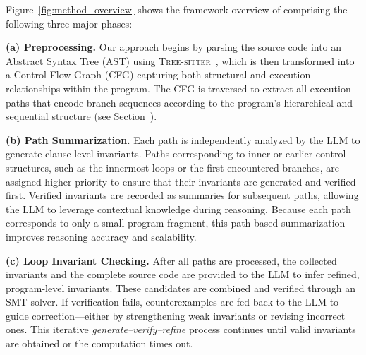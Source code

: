 \documentclass[letterpaper]{article} %
\begin{document}
Figure~\ref{fig:method_overview} shows the framework overview of \thistool{} comprising the following three major phases:

\textbf{(a) Preprocessing.} Our approach begins by parsing the source code into an Abstract Syntax Tree (AST) using \textsc{Tree-sitter}~\cite{max_brunsfeld_2025_17180150}, which is then transformed into a Control Flow Graph (CFG) capturing both structural and execution relationships within the program. The CFG is traversed to extract all execution paths that encode branch sequences according to the program’s hierarchical and sequential structure (see Section~).

\textbf{(b) Path Summarization.} Each path is independently analyzed by the LLM to generate clause-level invariants. Paths corresponding to inner or earlier control structures, such as the innermost loops or the first encountered branches, are assigned higher priority to ensure that their invariants are generated and verified first. 
Verified invariants are recorded as summaries for subsequent paths, allowing the LLM to leverage contextual knowledge during reasoning. Because each path corresponds to only a small program fragment, this path-based summarization improves reasoning accuracy and scalability.

\textbf{(c) Loop Invariant Checking.} After all paths are processed, the collected invariants and the complete source code are provided to the LLM to infer refined, program-level invariants. These candidates are combined and verified through an SMT solver. If verification fails, counterexamples are fed back to the LLM to guide correction—either by strengthening weak invariants or revising incorrect ones. This iterative \textit{generate–verify–refine} process continues until valid invariants are obtained or the computation times out.

\end{document}
